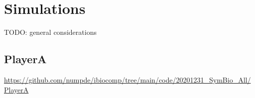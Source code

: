 \documentclass[12pt,notitlepage]{article}
\newcommand{\TODO}[1]{\textrm{\color{red}TODO: #1}}
\newcommand{\XOR}{\ensuremath{\mathop{\mathsf{xor}}}\xspace}
\newcommand{\hh}[1]{{\color{Purple}#1}}
\newcommand{\ra}[1]{{\color{Blue}#1}}
\begin{document}




%



\section{Simulations}

\TODO{general considerations}


\subsection{PlayerA} \label{s:sim:player}

\url{https://github.com/numpde/ibiocomp/tree/main/code/20201231_SymBio_All/PlayerA}




%
\end{document}
